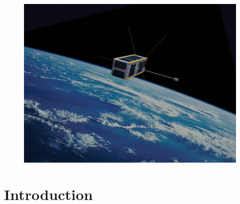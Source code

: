 \documentclass[11pt]{article}
\begin{document}
\begin{titlepage}
\begin{center}
\begin{figure} [H]

\centering 

\includegraphics[scale=0.4]{cubesat-1.jpg}

\end{figure}

\vfill




\end{center}

\end{titlepage}



\tableofcontents

\thispagestyle {empty}

\clearpage


\setcounter{page}{1}



\section{Introduction}
\end{document}
